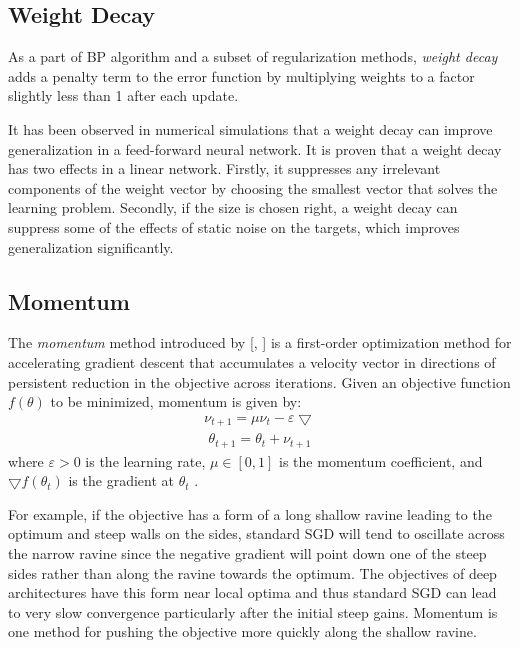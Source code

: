 \subsection{Weight Decay}


As a part of BP algorithm and a subset of regularization methods, \textit{weight decay} adds a penalty term to the error function by multiplying weights to a factor slightly less than 1 after each update. 

 It has been observed in numerical simulations that a weight decay can improve generalization in a feed-forward neural network. It is proven that a weight decay has two effects in a linear network. Firstly, it suppresses any irrelevant components of the weight vector by choosing the smallest vector that solves the learning problem. Secondly, if the size is chosen right, a weight decay can suppress some of the effects of static noise on the targets, which improves generalization significantly\cite{moody1995simple}. 

\subsection{Momentum}

The \textit{momentum} method introduced by [\citeauthor{polyak1964some}, \citeyear{polyak1964some}] is a first-order optimization method for accelerating gradient descent that accumulates a velocity vector in directions of persistent reduction in the objective across iterations. Given an objective function $f(\theta)$ to be minimized, momentum is given by:
\begin{equation}
	\label{eq:t}
	\begin{aligned}
		\nu_{t+1} = \mu\nu_t - \varepsilon\bigtriangledown 
	\end{aligned}
\end{equation}
\begin{equation}
	\label{eq:t}
	\begin{gathered}
	\theta_{t+1} = \theta_t + \nu_{t + 1}
	\end{gathered}
\end{equation}
where $\varepsilon > 0$ is the learning rate, $\mu \in [0,1]$ is the momentum coefficient, and $\bigtriangledown f(\theta_t)$ is the gradient at $\theta_t$ \cite{sutskever2013importance}. 

For example, if the objective has a form of a long shallow ravine leading to the optimum and steep walls on the sides, standard SGD will tend to oscillate across the narrow ravine since the negative gradient will point down one of the steep sides rather than along the ravine towards the optimum\cite{sgd}. The objectives of deep architectures have this form near local optima and thus standard SGD can lead to very slow convergence particularly after the initial steep gains. Momentum is one method for pushing the objective more quickly along the shallow ravine\cite{sgd}. 

